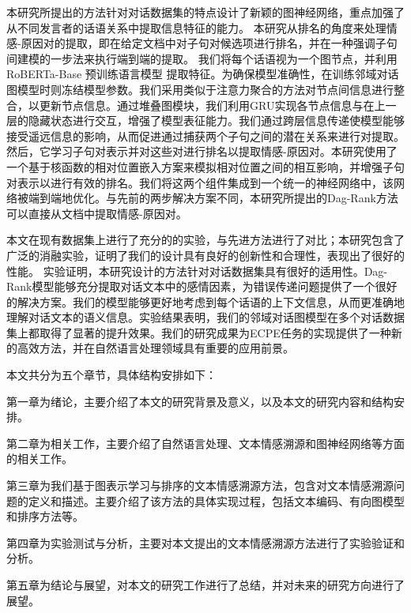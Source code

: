 本研究所提出的方法针对对话数据集的特点设计了新颖的图神经网络，重点加强了从不同发言者的话语关系中提取信息特征的能力。
本研究从排名的角度来处理情感-原因对的提取，即在给定文档中对子句对候选项进行排名，并在一种强调子句间建模的一步法来执行端到端的提取。
我们将每个话语视为一个图节点，并利用RoBERTa-Base 预训练语言模型 \cite{liu2019roberta}  提取特征。为确保模型准确性，在训练邻域对话图模型时则冻结模型参数。我们采用类似于注意力聚合的方法对节点间信息进行整合，以更新节点信息。通过堆叠图模块，我们利用GRU实现各节点信息与在上一层的隐藏状态进行交互，增强了模型表征能力。我们通过跨层信息传递使模型能够接受遥远信息的影响，从而促进通过捕获两个子句之间的潜在关系来进行对提取。
然后，它学习子句对表示并对这些对进行排名以提取情感-原因对。本研究使用了一个基于核函数的相对位置嵌入方案来模拟相对位置之间的相互影响，并增强子句对表示以进行有效的排名。我们将这两个组件集成到一个统一的神经网络中，该网络被端到端地优化。与先前的两步解决方案不同，本研究所提出的Dag-Rank方法可以直接从文档中提取情感-原因对。

本文在现有数据集上进行了充分的的实验，与先进方法进行了对比；本研究包含了广泛的消融实验，证明了我们的设计具有良好的创新性和合理性，表现出了很好的性能。
实验证明，本研究设计的方法针对对话数据集具有很好的适用性。Dag-Rank模型能够充分提取对话文本中的感情因素，为错误传递问题提供了一个很好的解决方案。我们的模型能够更好地考虑到每个话语的上下文信息，从而更准确地理解对话文本的语义信息。实验结果表明，我们的邻域对话图模型在多个对话数据集上都取得了显著的提升效果。我们的研究成果为ECPE任务的实现提供了一种新的高效方法，并在自然语言处理领域具有重要的应用前景。


本文共分为五个章节，具体结构安排如下：

第一章为绪论，主要介绍了本文的研究背景及意义，以及本文的研究内容和结构安排。

第二章为相关工作，主要介绍了自然语言处理、文本情感溯源和图神经网络等方面的相关工作。

第三章为我们基于图表示学习与排序的文本情感溯源方法，包含对文本情感溯源问题的定义和描述。主要介绍了该方法的具体实现过程，包括文本编码、有向图模型和排序方法等。

第四章为实验测试与分析，主要对本文提出的文本情感溯源方法进行了实验验证和分析。

第五章为结论与展望，对本文的研究工作进行了总结，并对未来的研究方向进行了展望。




